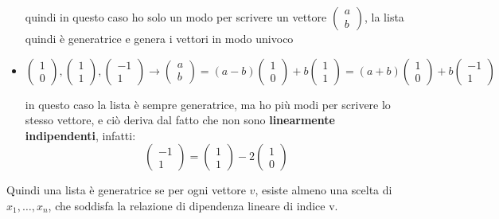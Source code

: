 \documentclass[a4paper,12pt]{article}
\begin{document}
\begin{itemize}
			quindi in questo caso ho solo un modo per scrivere un vettore $\begin{pmatrix}
				a \\
				b
			\end{pmatrix}$, la lista quindi è generatrice e genera i vettori in modo univoco
			\item $\begin{pmatrix}
				1 \\
				0
			\end{pmatrix}, 
			\begin{pmatrix}
				1 \\
				1
			\end{pmatrix},
			\begin{pmatrix}
				-1 \\
				1
			\end{pmatrix} \rightarrow \begin{pmatrix}
			a \\
			b
			\end{pmatrix} = 
			(a - b) \begin{pmatrix}
			1 \\
			0
			\end{pmatrix} + b \begin{pmatrix}
			1 \\
			1
		\end{pmatrix} = 
			(a + b) \begin{pmatrix}
			1 \\
			0
		\end{pmatrix} + b \begin{pmatrix}
			-1 \\
			1
		\end{pmatrix}$
		
		in questo caso la lista è sempre generatrice, ma ho più modi per scrivere lo stesso vettore, e ciò deriva dal fatto che non sono \textbf{linearmente indipendenti}, infatti:
		\[\begin{pmatrix}
			-1 \\
			1
		\end{pmatrix} = \begin{pmatrix}
		1 \\
		1
		\end{pmatrix} -2
		\begin{pmatrix}
			1 \\
			0
		\end{pmatrix}\]
	\end{itemize}
	
	Quindi una lista è generatrice se per ogni vettore $v$, esiste almeno una scelta di $x_1, \dots, x_n$, che soddisfa la relazione di dipendenza lineare di indice v. 
	
\end{document}
